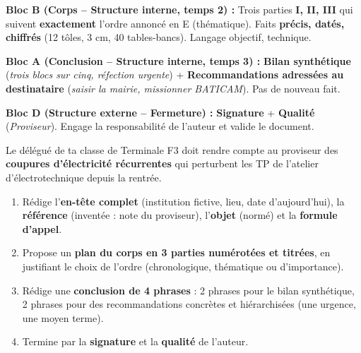 \documentclass[11pt]{article}
\begin{document}
\begin{exoresolu}
\noindent\textbf{Bloc B (Corps -- Structure interne, temps 2) :} Trois parties \textbf{I, II, III} qui suivent \textbf{exactement} l'ordre annoncé en E (thématique). Faits \textbf{précis, datés, chiffrés} (12 tôles, 3 cm, 40 tables-bancs). Langage objectif, technique.\par
\noindent\textbf{Bloc A (Conclusion -- Structure interne, temps 3) :} \textbf{Bilan synthétique} (\emph{trois blocs sur cinq, réfection urgente}) + \textbf{Recommandations adressées au destinataire} (\emph{saisir la mairie, missionner BATICAM}). Pas de nouveau fait.\par
\noindent\textbf{Bloc D (Structure externe -- Fermeture) :} \textbf{Signature} + \textbf{Qualité} (\emph{Proviseur}). Engage la responsabilité de l'auteur et valide le document.
\end{exoresolu}

\begin{exercice}
Le délégué de ta classe de Terminale F3 doit rendre compte au proviseur des \textbf{coupures d'électricité récurrentes} qui perturbent les TP de l'atelier d'électrotechnique depuis la rentrée.
\begin{enumerate}
\item Rédige l'\textbf{en-tête complet} (institution fictive, lieu, date d'aujourd'hui), la \textbf{référence} (inventée : note du proviseur), l'\textbf{objet} (normé) et la \textbf{formule d'appel}.
\item Propose un \textbf{plan du corps en 3 parties numérotées et titrées}, en justifiant le choix de l'ordre (chronologique, thématique ou d'importance).
\item Rédige une \textbf{conclusion de 4 phrases} : 2 phrases pour le bilan synthétique, 2 phrases pour des recommandations concrètes et hiérarchisées (une urgence, une moyen terme).
\item Termine par la \textbf{signature} et la \textbf{qualité} de l'auteur.
\end{enumerate}
\end{exercice}
\end{document}
